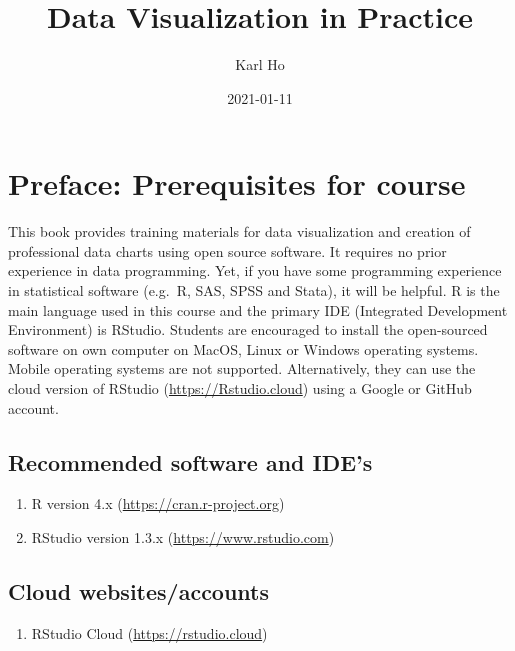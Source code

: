 \documentclass[
]{book}
\title{Data Visualization in Practice}
\author{Karl Ho}
\date{2021-01-11}
\providecommand{\tightlist}{%
  \setlength{\itemsep}{0pt}\setlength{\parskip}{0pt}}
\begin{document}
\maketitle

{
\setcounter{tocdepth}{1}
\tableofcontents
}
\hypertarget{preface-prerequisites-for-course}{%
\chapter*{Preface: Prerequisites for course}\label{preface-prerequisites-for-course}}

This book provides training materials for data visualization and creation of professional data charts using open source software. It requires no prior experience in data programming. Yet, if you have some programming experience in statistical software (e.g.~R, SAS, SPSS and Stata), it will be helpful. R is the main language used in this course and the primary IDE (Integrated Development Environment) is RStudio. Students are encouraged to install the open-sourced software on own computer on MacOS, Linux or Windows operating systems. Mobile operating systems are not supported. Alternatively, they can use the cloud version of RStudio (\url{https://Rstudio.cloud}) using a Google or GitHub account.

\hypertarget{recommended-software-and-ides}{%
\section{Recommended software and IDE's}\label{recommended-software-and-ides}}

\begin{enumerate}
\def\labelenumi{\arabic{enumi}.}
\tightlist
\item
  R version 4.x (\url{https://cran.r-project.org})
\item
  RStudio version 1.3.x (\url{https://www.rstudio.com})
\end{enumerate}

\hypertarget{cloud-websitesaccounts}{%
\section{Cloud websites/accounts}\label{cloud-websitesaccounts}}

\begin{enumerate}
\def\labelenumi{\arabic{enumi}.}
\tightlist
\item
  RStudio Cloud (\url{https://rstudio.cloud})
\end{enumerate}
\end{document}
